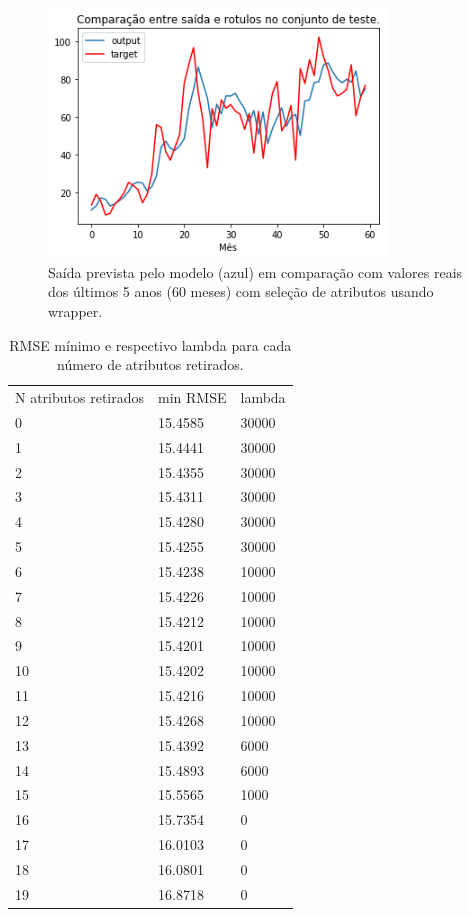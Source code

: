 \documentclass[a4paper, 12pt]{article}
\begin{document}
\begin{figure}[h!]
    \centering
    \includegraphics[width=9cm]{images/wrapper.png}
    \caption{Saída prevista pelo modelo (azul) em comparação com valores reais dos últimos 5 anos (60 meses) com seleção de atributos usando wrapper.}
\end{figure}

\begin{table}[]
    \centering
    \caption{RMSE mínimo e respectivo lambda para cada número de atributos retirados.}
\begin{tabular}{lll}
N atributos retirados & min RMSE & lambda \\
0                     & 15.4585 & 30000 \\
1                     & 15.4441 & 30000 \\
2                     & 15.4355 & 30000 \\
3                     & 15.4311 & 30000 \\
4                     & 15.4280 & 30000 \\
5                     & 15.4255 & 30000 \\
6                     & 15.4238 & 10000 \\
7                     & 15.4226 & 10000 \\
8                     & 15.4212 & 10000 \\
9                     & 15.4201 & 10000 \\
10                    & 15.4202 & 10000 \\
11                    & 15.4216 & 10000 \\
12                    & 15.4268 & 10000 \\
13                    & 15.4392 & 6000  \\
14                    & 15.4893 & 6000  \\
15                    & 15.5565 & 1000  \\
16                    & 15.7354 & 0     \\
17                    & 16.0103 & 0     \\
18                    & 16.0801 & 0     \\
19                    & 16.8718 & 0
\end{tabular}
\end{table}
\end{document}
